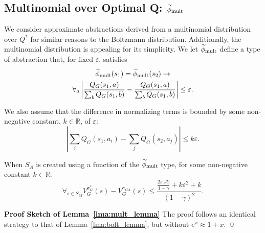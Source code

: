 \subsection{Multinomial over Optimal Q: $\epMu$}
\label{sec:mult}

We consider approximate abstractions derived from a multinomial distribution over $Q^*$ for similar reasons to the Boltzmann distribution. Additionally, the multinomial distribution is appealing for its simplicity.
\bdefn{$\epMu$}
We let $\epMu$ define a type of abstraction that, for fixed $\varepsilon$, satisfies
\begin{multline}
\widetilde \phi_{\text{mult}}(s_1) = \widetilde \phi_{\text{mult}}(s_2) \rightarrow \\
\forall_{a} \left|\frac{Q_G(s_1,a)}{\sum_b Q_G(s_1,b)} - \frac{Q_G(s_1,a)}{\sum_b Q_G(s_1,b)}\right| \leq \varepsilon.
\end{multline}
\edefn

We also assume that the difference in normalizing terms is bounded by some non-negative constant, $k \in \mathbb{R}$, of $\varepsilon$:
\begin{equation}
\left |\sum_i Q_G(s_1,a_i) - \sum_j Q_G(s_2,a_j) \right | \leq k\varepsilon.
\end{equation}
\begin{lma} When $S_A$ is created using a function of the $\epMu$ type, for some non-negative constant $k \in \mathbb{R}$:
\begin{equation}
\forall_{s \in S_M} V_G^{\pi^*_G}(s) - V_G^{\pi_{GA}}(s) \leq \frac{\frac{2\varepsilon|\mathcal{A}|}{1-\gamma} + k \varepsilon^2 + k}{(1-\gamma)^2}.
\end{equation}
\label{lma:mult_lemma}
\end{lma}

{\bf Proof Sketch of Lemma~\ref{lma:mult_lemma}} The proof follows an identical strategy to that of Lemma~\ref{lma:bolt_lemma}, but without $e^x \approx 1+x$.
\qed


